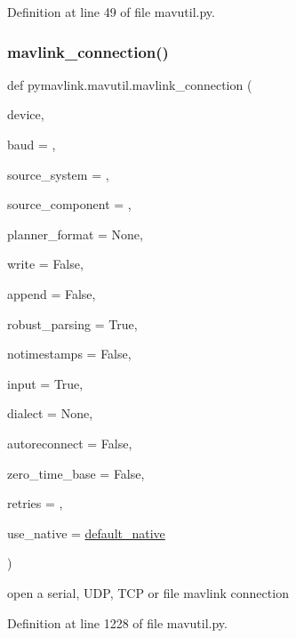 Definition at line 49 of file mavutil.\+py.

\mbox{\label{namespacepymavlink_1_1mavutil_aa6c4b8861f86ef3bb746fa0fab241c93}} 
\subsubsection{\texorpdfstring{mavlink\_connection()}{mavlink\_connection()}}
{\footnotesize\ttfamily def pymavlink.\+mavutil.\+mavlink\+\_\+connection (\begin{DoxyParamCaption}\item[{}]{device,  }\item[{}]{baud = {},  }\item[{}]{source\+\_\+system = {},  }\item[{}]{source\+\_\+component = {},  }\item[{}]{planner\+\_\+format = {\ttfamily None},  }\item[{}]{write = {\ttfamily False},  }\item[{}]{append = {\ttfamily False},  }\item[{}]{robust\+\_\+parsing = {\ttfamily True},  }\item[{}]{notimestamps = {\ttfamily False},  }\item[{}]{input = {\ttfamily True},  }\item[{}]{dialect = {\ttfamily None},  }\item[{}]{autoreconnect = {\ttfamily False},  }\item[{}]{zero\+\_\+time\+\_\+base = {\ttfamily False},  }\item[{}]{retries = {},  }\item[{}]{use\+\_\+native = {\ttfamily \mbox{\hyperlink{namespacepymavlink_1_1mavutil_a21ce9da7b698a7bc21c44b9f77341b62}{default\+\_\+native}}} }\end{DoxyParamCaption})}

\begin{DoxyVerb}open a serial, UDP, TCP or file mavlink connection\end{DoxyVerb}
 

Definition at line 1228 of file mavutil.\+py.

\mbox{\label{namespacepymavlink_1_1mavutil_adcc2e66e515b28aa81dd57269146f732}} 
